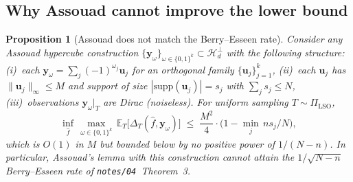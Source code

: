 \documentclass[11pt,a4paper]{article}
\theoremstyle{plain}
\newtheorem{proposition}[theorem]{Proposition}
\theoremstyle{definition}
\theoremstyle{remark}
\newcommand{\by}{\mathbf{y}}
\newcommand{\bu}{\mathbf{u}}
\newcommand{\E}{\mathbb{E}}
\newcommand{\Hcal}{\mathcal{H}}
\begin{document}
\subsection{Why Assouad cannot improve the lower bound}

\begin{proposition}[Assouad does not match the Berry--Esseen rate]
\label{prop:assouad-fails}
Consider any Assouad hypercube construction $\{\by_\omega\}_{\omega \in \{0,1\}^k} \subset \Hcal_d^\perp$
with the following structure: (i)~each $\by_\omega = \sum_j (-1)^{\omega_j}\bu_j$
for an orthogonal family $\{\bu_j\}_{j=1}^k$, (ii)~each $\bu_j$ has
$\|\bu_j\|_\infty \le M$ and support of size $|\mathrm{supp}(\bu_j)| = s_j$
with $\sum_j s_j \le N$, (iii)~observations $\by_\omega|_T$ are Dirac
(noiseless). For uniform sampling $T \sim \Pi_{\mathrm{LSO}}$,
\begin{equation}
    \inf_{\hat f}\, \max_{\omega \in \{0,1\}^k}\,
    \E_T\!\big[\Delta_T(\hat f, \by_\omega)\big]
    \;\le\; \frac{M^2}{4}\cdot\big(1 - \min_j\, n s_j/N\big),
    \label{eq:assouad-fails}
\end{equation}
which is $O(1)$ in $M$ but bounded below by no positive power of
$1/(N-n)$. In particular, Assouad's lemma with this construction
\emph{cannot} attain the $1/\sqrt{N-n}$ Berry--Esseen rate of
\texttt{notes/04}~Theorem~3.
\end{proposition}
\end{document}
